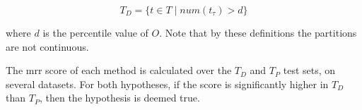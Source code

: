 \begin{equation}
T_D = \{ t \in T \mid \textit{num}(t_\tau) > d \}
\end{equation}

\noindent
where $d$ is the  percentile value of $O$. Note that by these definitions the partitions are not continuous.

The \gls{mrr} score of each method is calculated over the $T_D$ and $T_P$ test sets, on several datasets. For both hypotheses, if the score is significantly higher in $T_D$ than $T_P$, then the hypothesis is deemed true.

\begin{comment}
foreach fact in dataset
    fact_count_i_timespan(fact) >> array
done
sort(array)
median(array)
\end{comment}